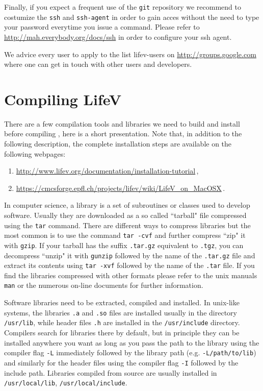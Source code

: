 Finally, if you expect a frequent use of the \verb!git! repository
we recommend to costumize the
\verb!ssh! and \verb!ssh-agent!
 in order to gain acces  without the need to type your password everytime you issue
a command. Please refer to \url{http://mah.everybody.org/docs/ssh} in order to configure
your ssh agent.

We advice every user to apply to the list lifev-users on \url{http://groups.google.com}
where one can get in touch with other users and developers.

\section{Compiling LifeV}
\label{compile-lifev}

There are a few compilation tools and libraries we need to build and install before
compiling \lifev, here is a short presentation. Note that, in addition to the following description, the complete installation steps are available on the following webpages:
\begin{enumerate}
\item \url{http://www.lifev.org/documentation/installation-tutorial}\,,
\item \url{https://cmcsforge.epfl.ch/projects/lifev/wiki/LifeV_on_MacOSX}\,.
\end{enumerate}



In computer science, a library is a set of subroutines or classes used to develop software.
Usually they are downloaded as a so called ``tarball" file
compressed using the \verb!tar! command. There are different ways to compress
libraries but the most common is to use the command \verb!tar -cvf! and further compress
``zip" it with \verb!gzip!. If your tarball has the suffix \verb!.tar.gz! equivalent to \verb!.tgz!,
you can decompress ``unzip" it with \verb!gunzip! followed by the name of the \verb!.tar.gz! file and
extract its contents using \verb!tar -xvf! followed by the name of the \verb!.tar! file.
If you find the libraries compressed with other formats
please refer to the unix manuals \verb!man! or the numerous
on-line documents for further information.

Software libraries need to be extracted, compiled and installed. In unix-like
systems, the libraries \verb!.a! and
\verb!.so! files are installed usually in the directory \verb!/usr/lib!,
 while header files
\verb!.h! are installed in the \verb!/usr/include! directory. Compilers search
for libraries there by default, but in principle they can be installed anywhere you want
as long as you pass the path to the library using the compiler flag \verb!-L! immediately
followed by the library path (e.g. \verb!-L/path/to/lib!) and similarly for the header files using the compiler
flag \verb!-I! followed by the include path. Libraries compiled from source are usually installed in \verb!/usr/local/lib!, \verb!/usr/local/include!.

